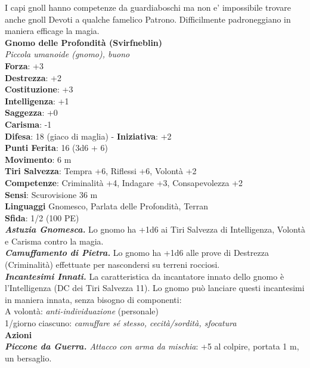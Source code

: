 \begin{multicols}{2}
I capi gnoll hanno competenze da guardiaboschi ma non e' impossibile trovare anche gnoll Devoti a qualche famelico Patrono. Difficilmente padroneggiano in maniera efficage la magia.\\


\medskip\textbf{Gnomo delle Profondità (Svirfneblin)} \\
\emph{Piccola umanoide (gnomo), buono}\\
\textbf{Forza}: +3\\
\textbf{Destrezza}: +2\\
\textbf{Costituzione}: +3\\
\textbf{Intelligenza}: +1\\
\textbf{Saggezza}: +0\\
\textbf{Carisma}: -1\\
\textbf{Difesa}: 18 (giaco di maglia) - \textbf{Iniziativa}: +2\\
\textbf{Punti Ferita}: 16 (3d6 + 6)\\
\textbf{Movimento}: 6 m\\
\textbf{Tiri Salvezza}: Tempra +6, Riflessi +6, Volontà +2\\
\textbf{Competenze}: Criminalità +4, Indagare +3, Consapevolezza +2\\
\textbf{Sensi}: Scurovisione 36 m\\
\textbf{Linguaggi} Gnomesco, Parlata delle Profondità, Terran\\
\textbf{Sfida}: 1/2 (100 PE)\smallskip\\
\emph{\textbf{Astuzia Gnomesca.}} Lo gnomo ha +1d6 ai Tiri Salvezza di Intelligenza, Volontà e Carisma contro la magia.\\
\emph{\textbf{Camuffamento di Pietra.}} Lo gnomo ha +1d6 alle prove di Destrezza (Criminalità) effettuate per nascondersi su terreni rocciosi.\\
\emph{\textbf{Incantesimi Innati.}} La caratteristica da incantatore innato dello gnomo è l'Intelligenza (DC dei Tiri Salvezza 11). Lo gnomo può lanciare questi incantesimi in maniera innata, senza bisogno di componenti:\\
A volontà: \emph{anti-individuazione} (personale)\\
1/giorno ciascuno: \emph{camuffare sé stesso, cecità/sordità, sfocatura}\\
\smallskip\textbf{Azioni}\\
\emph{\textbf{Piccone da Guerra.} Attacco con arma da mischia}: +5 al colpire, portata 1 m, un bersaglio.\\

\end{multicols}
